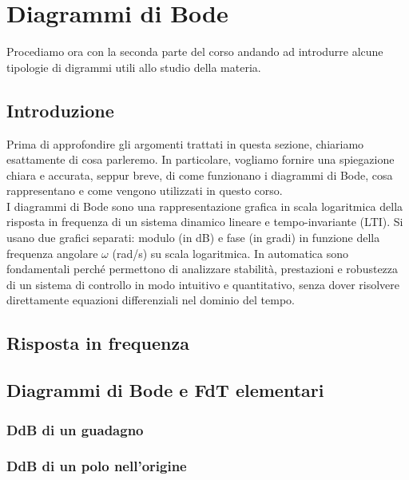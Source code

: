\documentclass[../main.tex]{subfiles}
\begin{document}
\clearpage
\thispagestyle{empty}
\vspace*{7cm}
\section{Diagrammi di Bode}
\vspace*{1.5cm}

Procediamo ora con la seconda parte del corso andando ad introdurre alcune tipologie di digrammi utili allo studio della materia.


\subsection{Introduzione}

Prima di approfondire gli argomenti trattati in questa sezione, chiariamo esattamente di cosa parleremo. In particolare, vogliamo fornire una spiegazione chiara e accurata, seppur breve, di come funzionano i diagrammi di Bode, cosa rappresentano e come vengono utilizzati in questo corso.\\


I diagrammi di Bode sono una rappresentazione grafica in scala logaritmica della risposta in frequenza di un sistema dinamico lineare e tempo-invariante (LTI). Si usano due grafici separati: modulo (in dB) e fase (in gradi) in funzione della frequenza angolare $\omega$ (rad/s) su scala logaritmica. In automatica sono fondamentali perché permettono di analizzare stabilità, prestazioni e robustezza di un sistema di controllo in modo intuitivo e quantitativo, senza dover risolvere direttamente equazioni differenziali nel dominio del tempo.


\subsection{Risposta in frequenza}

\subsection{Diagrammi di Bode e FdT elementari}


\subsubsection{DdB di un guadagno}
\subsubsection{DdB di un polo nell'origine}
\end{document}
